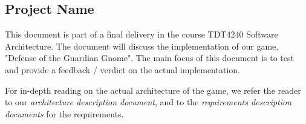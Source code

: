 \subsection{Project Name}

This document is part of a final delivery in the course TDT4240 Software Architecture. The document will discuss the implementation of our game, "Defense of the Guardian Gnome". The main focus of this document is to test and provide a feedback / verdict on the actual implementation. 

For in-depth reading on the actual architecture of the game, we refer the reader to our \emph{architecture description document}, and to the \emph{requirements description documents} for the requirements. 

